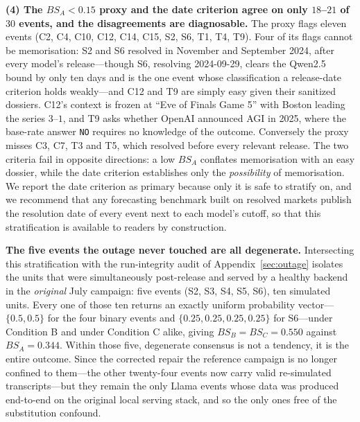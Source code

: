 \documentclass[11pt,journal,onecolumn]{IEEEtran}
\begin{document}
\textbf{(4) The $BS_A < 0.15$ proxy and the date criterion agree on only $18$--$21$ of $30$ events, and the disagreements are diagnosable.} The proxy flags eleven events (C2, C4, C10, C12, C14, C15, S2, S6, T1, T4, T9). Four of its flags cannot be memorisation: S2 and S6 resolved in November and September 2024, after every model's release---though S6, resolving 2024-09-29, clears the Qwen2.5 bound by only ten days and is the one event whose classification a release-date criterion holds weakly---and C12 and T9 are simply easy given their sanitized dossiers. C12's context is frozen at ``Eve of Finals Game 5'' with Boston leading the series $3$--$1$, and T9 asks whether OpenAI announced AGI in 2025, where the base-rate answer \texttt{NO} requires no knowledge of the outcome. Conversely the proxy misses C3, C7, T3 and T5, which resolved before every relevant release. The two criteria fail in opposite directions: a low $BS_A$ conflates memorisation with an easy dossier, while the date criterion establishes only the \emph{possibility} of memorisation. We report the date criterion as primary because only it is safe to stratify on, and we recommend that any forecasting benchmark built on resolved markets publish the resolution date of every event next to each model's cutoff, so that this stratification is available to readers by construction.

\textbf{The five events the outage never touched are all degenerate.} Intersecting this stratification with the run-integrity audit of Appendix~\ref{sec:outage} isolates the units that were simultaneously post-release and served by a healthy backend in the \emph{original} July campaign: five events (S2, S3, S4, S5, S6), ten simulated units. Every one of those ten returns an exactly uniform probability vector---$\{0.5, 0.5\}$ for the four binary events and $\{0.25, 0.25, 0.25, 0.25\}$ for S6---under Condition B and under Condition C alike, giving $BS_B = BS_C = 0.550$ against $BS_A = 0.344$. Within those five, degenerate consensus is not a tendency, it is the entire outcome. Since the corrected repair the reference campaign is no longer confined to them---the other twenty-four events now carry valid re-simulated transcripts---but they remain the only Llama events whose data was produced end-to-end on the original local serving stack, and so the only ones free of the substitution confound.
\end{document}
